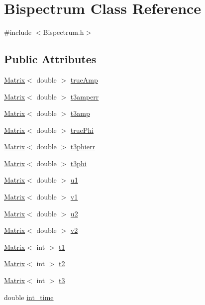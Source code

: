 \hypertarget{classBispectrum}{
\section{Bispectrum Class Reference}
\label{classBispectrum}
}


{\ttfamily \#include $<$Bispectrum.h$>$}

\subsection*{Public Attributes}
\begin{DoxyCompactItemize}
\item 
\hyperlink{classMatrix}{Matrix}$<$ double $>$ \hyperlink{classBispectrum_a85904846b909567890fb1395b9fcb27b}{trueAmp}
\item 
\hyperlink{classMatrix}{Matrix}$<$ double $>$ \hyperlink{classBispectrum_acfb791e23ce2fe5a0d3207d600f5fced}{t3amperr}
\item 
\hyperlink{classMatrix}{Matrix}$<$ double $>$ \hyperlink{classBispectrum_a4f353f039c28e9a954b35efeee88803a}{t3amp}
\item 
\hyperlink{classMatrix}{Matrix}$<$ double $>$ \hyperlink{classBispectrum_ac6576cd26a230281ed9471dc18f6c128}{truePhi}
\item 
\hyperlink{classMatrix}{Matrix}$<$ double $>$ \hyperlink{classBispectrum_acbda066ba007c56246f1a7dc0040e8a4}{t3phierr}
\item 
\hyperlink{classMatrix}{Matrix}$<$ double $>$ \hyperlink{classBispectrum_afb0c6a5e00123a0816cdaf3f5cf99fb2}{t3phi}
\item 
\hyperlink{classMatrix}{Matrix}$<$ double $>$ \hyperlink{classBispectrum_a4aa12f9f42ec6a9a622eae258886a70a}{u1}
\item 
\hyperlink{classMatrix}{Matrix}$<$ double $>$ \hyperlink{classBispectrum_aaaba6a43c24620293150b6c8b1e7e3cc}{v1}
\item 
\hyperlink{classMatrix}{Matrix}$<$ double $>$ \hyperlink{classBispectrum_a1273b649ed0b0395095e46553abd4590}{u2}
\item 
\hyperlink{classMatrix}{Matrix}$<$ double $>$ \hyperlink{classBispectrum_a3f96bf8f14f36a1b554f094e74eea14e}{v2}
\item 
\hyperlink{classMatrix}{Matrix}$<$ int $>$ \hyperlink{classBispectrum_acdc726e2151be0caed4263bfd5945d35}{t1}
\item 
\hyperlink{classMatrix}{Matrix}$<$ int $>$ \hyperlink{classBispectrum_a0fc19bc4234f4d5f5b5fff0f16a1d19a}{t2}
\item 
\hyperlink{classMatrix}{Matrix}$<$ int $>$ \hyperlink{classBispectrum_a35a0c8149a0543a004044ff4ffc2eea1}{t3}
\item 
double \hyperlink{classBispectrum_a1f82b8ea4518fa3870102b1975282c44}{int\_\-time}
\end{DoxyCompactItemize}



